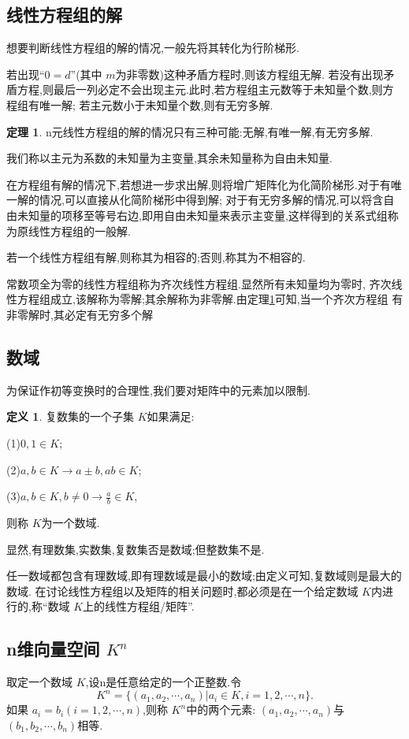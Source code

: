 \documentclass[a4paper,11pt]{article}%
\theoremstyle{remark}
\theoremstyle{definition}
\newtheorem{theorem}{定理}[section]
\theoremstyle{definition}
\newtheorem*{definition}{定义}
\theoremstyle{plain}
\begin{document}
\subsection{线性方程组的解}
想要判断线性方程组的解的情况,一般先将其转化为行阶梯形.

若出现``$0=d$''(其中 $m$为非零数)这种矛盾方程时,则该方程组无解.
若没有出现矛盾方程,则最后一列必定不会出现主元.此时,若方程组主元数等于未知量个数,则方程组有唯一解;
若主元数小于未知量个数,则有无穷多解.

\begin{theorem}\label{1.1}
    n元线性方程组的解的情况只有三种可能:无解,有唯一解,有无穷多解.
\end{theorem}
我们称以主元为系数的未知量为主变量,其余未知量称为自由未知量.

在方程组有解的情况下,若想进一步求出解,则将增广矩阵化为化简阶梯形.对于有唯一解的情况,可以直接从化简阶梯形中得到解;
对于有无穷多解的情况,可以将含自由未知量的项移至等号右边,即用自由未知量来表示主变量,这样得到的关系式组称为原线性方程组的一般解.

若一个线性方程组有解,则称其为相容的;否则,称其为不相容的.

常数项全为零的线性方程组称为齐次线性方程组.显然所有未知量均为零时,
齐次线性方程组成立,该解称为零解;其余解称为非零解.由定理\ref{1.1}可知,当一个齐次方程组
有非零解时,其必定有无穷多个解
\subsection{数域}
为保证作初等变换时的合理性,我们要对矩阵中的元素加以限制.
\begin{definition}
    复数集的一个子集 $K$如果满足:

(1)$0,1\in K$;

(2)$a,b\in K\rightarrow a\pm b,ab\in K$;

(3)$a,b\in K,b\neq 0\rightarrow \frac{a}{b}\in K$,

则称 $K$为一个数域.
\end{definition}
显然,有理数集,实数集,复数集否是数域;但整数集不是.

任一数域都包含有理数域,即有理数域是最小的数域;由定义可知,复数域则是最大的数域.
在讨论线性方程组以及矩阵的相关问题时,都必须是在一个给定数域 $K$内进行的,称``数域 $K$上的线性方程组/矩阵''.
\subsection{n维向量空间 $K^n$}
取定一个数域 $K$,设n是任意给定的一个正整数.令
\[K^n=\{(a_1,a_2,\cdots,a_n)\vert a_i\in K ,i=1,2,\cdots,n\}.\]
如果 $a_i=b_i(i=1,2,\cdots,n)$,则称 $K^n$中的两个元素: $(a_1,a_2,\cdots,a_n)$与
$(b_1,b_2,\cdots,b_n)$相等.
\end{document}
